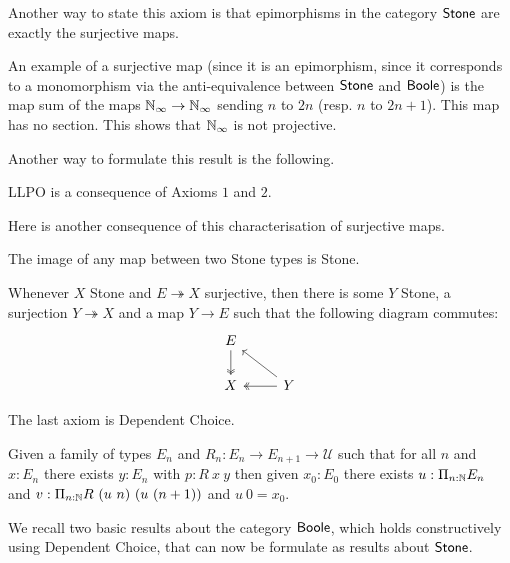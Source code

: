 Another way to state this axiom is that epimorphisms in the category $\mathsf{Stone}$ are exactly the surjective maps.

\medskip

An example of a surjective map (since it is an epimorphism, since it corresponds to a monomorphism via the anti-equivalence
between $\mathsf{Stone}$ and $\mathsf{Boole}$) is the map sum of the maps $\mathbb{N}_{\infty}\rightarrow \mathbb{N}_{\infty}$ sending $n$ to $2n$ (resp. $n$ to $2n+1$).
This map has no section. This shows that $\mathbb{N}_{\infty}$ is not projective.

Another way to formulate this result is the following.

\begin{proposition}
  LLPO is a consequence of Axioms $1$ and $2$.
\end{proposition}

Here is another consequence of this characterisation of surjective maps.

\begin{proposition}
  The image of any map between two Stone types is Stone.
\end{proposition}

\begin{axiom}
  Whenever $X$ Stone and $E\twoheadrightarrow X$ surjective, then there is some $Y$ Stone,
    a surjection $Y \twoheadrightarrow X$ and a map $Y\to E$ such that the following diagram commutes:
    \begin{equation}\begin{tikzcd}
      E \arrow[d,""',two heads]\\
      X & \arrow[l, "", two heads] Y\arrow[lu, ""']
    \end{tikzcd}\end{equation}  
\end{axiom} 




The last axiom is Dependent Choice.

\begin{axiom}
  Given a family of types $E_n$ and $R_n:E_n\rightarrow E_{n+1}\rightarrow {\mathcal U}$ such that
  for all $n$ and $x:E_n$ there exists $y:E_n$ with $p:R~x~y$ then given $x_0:E_0$ there exists
  $u:\Pi_{n:\mathbb{N}}E_n$ and $v:\Pi_{n:\mathbb{N}}R~(u~n)~(u~(n+1))$ and $u~0 = x_0$.
\end{axiom}

\medskip

We recall two basic results about the category $\mathsf{Boole}$, which holds constructively using Dependent Choice,
that can now be formulate as results about $\mathsf{Stone}$.

